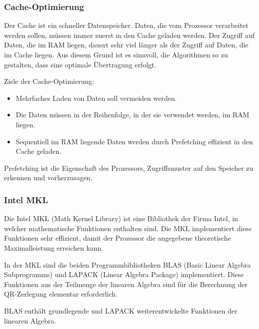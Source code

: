 \subsubsection{Cache-Optimierung}
Der Cache ist ein schneller Datenspeicher. Daten, die vom Prozessor verarbeitet werden sollen, müssen immer zuerst in den Cache geladen werden.
Der Zugriff auf Daten, die im RAM liegen, dauert sehr viel länger als der Zugriff auf Daten, die im Cache liegen.
Aus diesem Grund ist es sinnvoll, die Algorithmen so zu gestalten, dass eine optimale Übertragung erfolgt.

Ziele der Cache-Optimierung:
\begin{itemize}
	\item Mehrfaches Laden von Daten soll vermeiden werden.
	\item Die Daten müssen in der Reihenfolge, in der sie verwendet werden, im RAM liegen.
	\item Sequentiell im RAM liegende Daten werden durch Prefetching effizient in den Cache geladen.
\end{itemize}

Prefetching ist die Eigenschaft des Prozessors, Zugriffsmuster auf den Speicher zu erkennen und vorherzusagen.	

\subsubsection{Intel MKL}
Die Intel MKL (Math Kernel Library) \cite{mkl} ist eine Bibliothek der Firma Intel, in welcher mathematische Funktionen enthalten sind.
Die MKL implementiert diese Funktionen sehr effizient, damit der Prozessor die angegebene theoretische Maximalleistung erreichen kann.



In der MKL sind die beiden Programmbibliotheken BLAS (Basic Linear Algebra Subprogramms) und LAPACK (Linear Algebra Package) implementiert. 
Diese Funktionen aus der Teilmenge der linearen Algebra sind für die Berechnung der QR-Zerlegung elementar erforderlich.

BLAS enthält grundlegende und LAPACK weiterentwickelte Funktionen der linearen Algebra.









